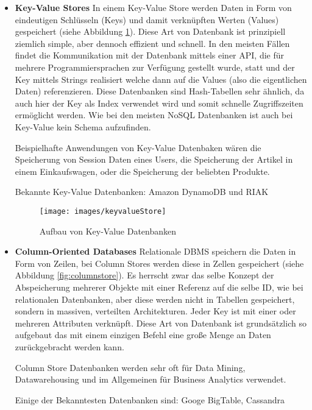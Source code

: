 \begin{itemize}
	\item \textbf{Key-Value Stores\newline}
	In einem Key-Value Store werden Daten in Form von eindeutigen Schlüsseln (Keys) und damit verknüpften Werten (Values) gespeichert (siehe Abbildung \ref{fig:keyvalue}). Diese Art von Datenbank ist prinzipiell ziemlich simple, aber dennoch effizient und schnell. In den meisten Fällen findet die Kommunikation mit der Datenbank mittels einer API, die für mehrere Programmiersprachen zur Verfügung gestellt wurde, statt und der Key mittels Strings realisiert welche dann auf die Values (also die eigentlichen Daten) referenzieren. Diese Datenbanken sind Hash-Tabellen sehr ähnlich, da auch hier der Key als Index verwendet wird und somit schnelle Zugriffszeiten ermöglicht werden. Wie bei den meisten NoSQL Datenbanken ist auch bei Key-Value kein Schema aufzufinden.

	Beispielhafte Anwendungen von Key-Value Datenbaken wären die Speicherung von Session Daten eines Users, die Speicherung der Artikel in einem Einkaufswagen, oder die Speicherung der beliebten Produkte.

	Bekannte Key-Value Datenbanken: Amazon DynamoDB und RIAK\nextline

	\begin{figure}[h]\centering
		\texttt{[image: images/keyvalueStore]}
		\caption{Aufbau von Key-Value Datenbanken}
		\label{fig:keyvalue}
	\end{figure}

	\item \textbf{Column-Oriented Databases\newline}
	Relationale DBMS speichern die Daten in Form von Zeilen, bei Column Stores werden diese in Zellen gespeichert (siehe Abbildung \ref{fig:columnstore}). Es herrscht zwar das selbe Konzept der Abspeicherung mehrerer Objekte mit einer Referenz auf die selbe ID, wie bei relationalen Datenbanken, aber diese werden nicht in Tabellen gespeichert, sondern in massiven, verteilten Architekturen. Jeder Key ist mit einer oder mehreren Attributen verknüpft. Diese Art von Datenbank ist grundsätzlich so aufgebaut das mit einem einzigen Befehl eine große Menge an Daten zurückgebracht werden kann. 

	Column Store Datenbanken werden sehr oft für Data Mining, Datawarehousing und im Allgemeinen für Business Analytics verwendet.

	Einige der Bekanntesten Datenbanken sind: Googe BigTable, Cassandra


\end{itemize}
